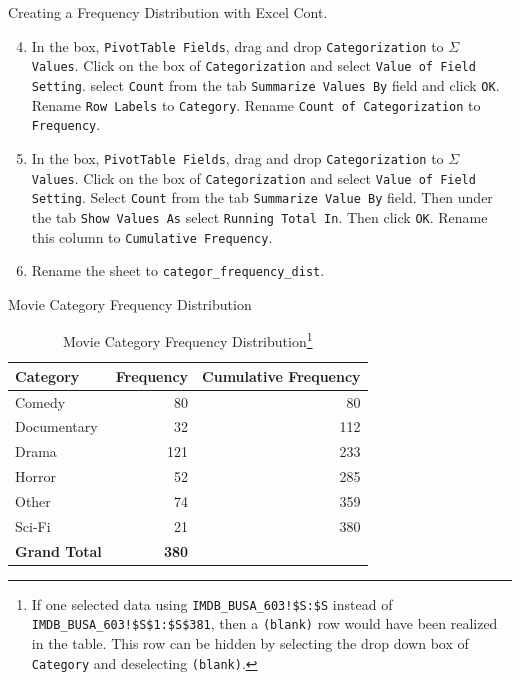 \documentclass[pdf]{beamer}
\theoremstyle{remark}
\theoremstyle{definition}
\begin{document}
\begin{frame}[t]{Creating a Frequency Distribution with Excel Cont.}
\begin{enumerate}
\setcounter{enumi}{3}
\item In the box, \texttt{PivotTable Fields}, drag and drop \texttt{Categorization} to \texttt{$\Sigma$ Values}.  Click on the box of \texttt{Categorization} and select \texttt{Value of Field Setting}.  select \texttt{Count} from the tab \texttt{Summarize Values By} field and click \texttt{OK}. Rename \texttt{Row Labels} to \texttt{Category}.  Rename \texttt{Count of Categorization} to \texttt{Frequency}.
\item In the box, \texttt{PivotTable Fields}, drag and drop \texttt{Categorization} to \texttt{$\Sigma$ Values}.  Click on the box of \texttt{Categorization} and select \texttt{Value of Field Setting}.  Select \texttt{Count} from the tab \texttt{Summarize Value By} field.  Then under the tab \texttt{Show Values As} select \texttt{Running Total In}.  Then click \texttt{OK}.  Rename this column to \texttt{Cumulative Frequency}.
\item  Rename the sheet to \texttt{categor\_frequency\_dist}.
\end{enumerate}
\end{frame}

\begin{frame}[t]{Movie Category Frequency Distribution}
\setcounter{table}{0}
\begin{table}[htbp]
  \centering
  \captionsetup{justification=centering}
    \begin{tabular}{lrr}
    \rowcolor[rgb]{ .851,  .882,  .949} \textbf{Category} & \multicolumn{1}{l}{\textbf{Frequency}} & \multicolumn{1}{l}{\textbf{Cumulative Frequency}}\\
    \midrule
    Comedy & 80 & 80 \\
    Documentary & 32 & 112 \\
    Drama & 121 & 233 \\
    Horror & 52 & 285 \\
    Other & 74 & 359\\
    Sci-Fi & 21 & 380\\
    \midrule
    \rowcolor[rgb]{ .851,  .882,  .949} \textbf{Grand Total} & \textbf{380} & \\
    \end{tabular}%
     \caption{Movie Category Frequency Distribution\footnote{If one selected data using \texttt{IMDB\_BUSA\_603!\$S:\$S} instead of \texttt{IMDB\_BUSA\_603!\$S\$1:\$S\$381}, then a \texttt{(blank)} row would have been realized in the table.  This row can be hidden by selecting the drop down box of \texttt{Category} and deselecting \texttt{(blank)}.} }
  \label{tab:catfd}%
\end{table}%
\end{frame}
\end{document}

